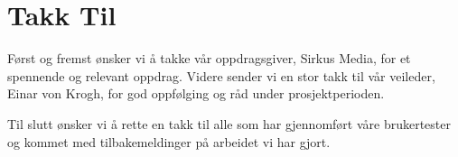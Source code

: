 \cleardoublepage
\chapter*{Takk Til}


Først og fremst ønsker vi å takke vår oppdragsgiver, Sirkus Media, for et spennende og relevant oppdrag. Videre sender vi en stor takk til vår veileder, Einar von Krogh, for god oppfølging og råd under prosjektperioden.

Til slutt ønsker vi å rette en takk til alle som har gjennomført våre brukertester og kommet med tilbakemeldinger på arbeidet vi har gjort.